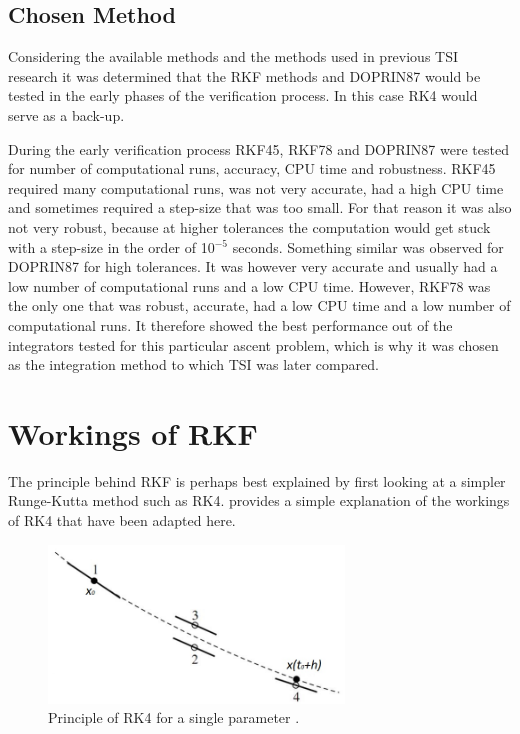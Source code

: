 \subsection{Chosen Method}
\label{subsec:chosenMethod}
Considering the available methods and the methods used in previous \ac{TSI} research it was determined that the \ac{RKF} methods and \ac{DOPRIN87} would be tested in the early phases of the verification process. In this case \ac{RK4} would serve as a back-up. 

During the early verification process \ac{RKF45}, \ac{RKF78} and \ac{DOPRIN87} were tested for number of computational runs, accuracy, CPU time and robustness. \ac{RKF45} required many computational runs, was not very accurate, had a high CPU time and sometimes required a step-size that was too small. For that reason it was also not very robust, because at higher tolerances the computation would get stuck with a step-size in the order of 10$^{-5}$ seconds. Something similar was observed for \ac{DOPRIN87} for high tolerances. It was however very accurate and usually had a low number of computational runs and a low CPU time. However, \ac{RKF78} was the only one that was robust, accurate, had a low CPU time and a low number of computational runs. It therefore showed the best performance out of the integrators tested for this particular ascent problem, which is why it was chosen as the integration method to which \ac{TSI} was later compared.


\section{Workings of \ac{RKF}}
\label{sec:rkf}
The principle behind \ac{RKF} is perhaps best explained by first looking at a simpler Runge-Kutta method such as \ac{RK4}. \cite{noomen2013int} provides a simple explanation of the workings of \ac{RK4} that have been adapted here. 




\begin{figure}[H]
\centering
\includegraphics[width=0.7\textwidth]{figures/integrators/rk4_noomen2013int.jpg}
\caption{Principle of \ac{RK4} for a single parameter \cite{noomen2013int}.}
\label{fig:rk4_noomen2013int}
\end{figure}

